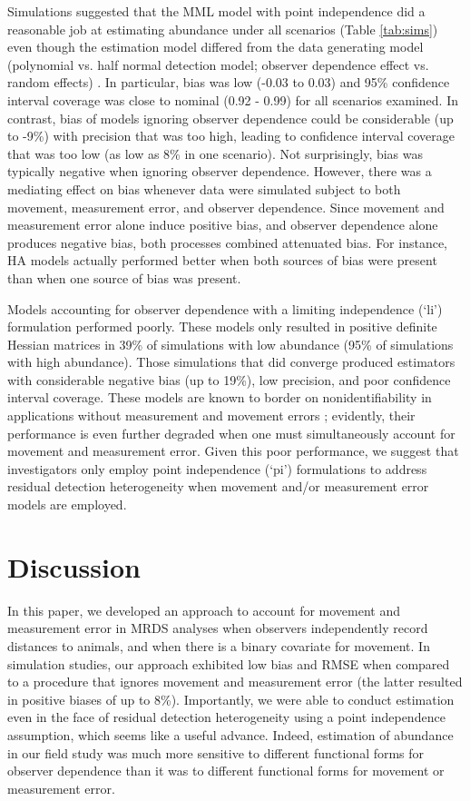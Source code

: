 \documentclass[aoas,preprint]{imsart}
\numberwithin{equation}{section}
\theoremstyle{plain}
\begin{document}
Simulations suggested that the MML model with point independence did a reasonable job at estimating abundance under all scenarios (Table \ref{tab:sims}) even though the estimation model differed from the data generating model (polynomial vs. half normal detection model; observer dependence effect vs. random effects) .  In particular, bias was low (-0.03 to 0.03) and 95\% confidence interval coverage was close to nominal (0.92 - 0.99) for all scenarios examined.  In contrast, bias of models ignoring observer dependence could be considerable (up to -9\%) with precision that was too high, leading to confidence interval coverage that was too low (as low as 8\% in one scenario).  Not surprisingly, bias was typically negative when ignoring observer dependence. However, there was a mediating effect on bias whenever data were simulated subject to both movement, measurement error, and observer dependence.  Since movement and measurement error alone induce positive bias, and observer dependence alone produces negative bias, both processes combined attenuated bias. For instance, HA models actually performed better when both sources of bias were present than when one source of bias was present.

Models accounting for observer dependence with a limiting independence (`li') formulation performed poorly.  These models only resulted in positive definite Hessian matrices in 39\% of simulations with low abundance (95\% of simulations with high abundance).  Those simulations that did converge produced estimators with considerable negative bias (up to 19\%), low precision, and poor confidence interval coverage.  These models are known to border on nonidentifiability in applications without measurement and movement errors \citep{BucklandEtAl2010,MacKenzieClement2016}; evidently, their performance is even further degraded when one must simultaneously account for movement and measurement error.  Given this poor performance, we suggest that investigators only employ point independence (`pi') formulations to address residual detection heterogeneity when movement and/or measurement error models are employed.


\section{Discussion}

In this paper, we developed an approach to account for movement and measurement error in MRDS analyses when observers independently record distances to animals, and when there is a binary covariate for movement. In simulation studies, our approach exhibited low bias and RMSE when compared to a procedure that ignores movement and measurement error (the latter resulted in positive biases of up to 8\%).  Importantly, we were able to conduct estimation even in the face of residual detection heterogeneity using a point independence assumption, which seems like a useful advance. Indeed, estimation of abundance in our field study was much more sensitive to different functional forms for observer dependence than it was to different functional forms for movement or measurement error.
\end{document}

